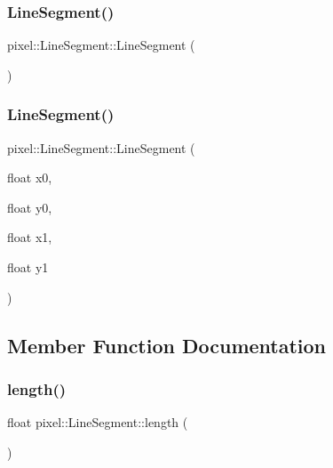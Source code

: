 \subsubsection{\texorpdfstring{Line\+Segment()}{LineSegment()}\hspace{0.1cm}{\footnotesize\ttfamily [1/2]}}
{\footnotesize\ttfamily pixel\+::\+Line\+Segment\+::\+Line\+Segment (\begin{DoxyParamCaption}{ }\end{DoxyParamCaption})\hspace{0.3cm}{\ttfamily [default]}}

\mbox{\label{classpixel_1_1_line_segment_a908ff0ace1fa46fa4ddc23d0f4413b18}} 
\subsubsection{\texorpdfstring{Line\+Segment()}{LineSegment()}\hspace{0.1cm}{\footnotesize\ttfamily [2/2]}}
{\footnotesize\ttfamily pixel\+::\+Line\+Segment\+::\+Line\+Segment (\begin{DoxyParamCaption}\item[{float}]{x0,  }\item[{float}]{y0,  }\item[{float}]{x1,  }\item[{float}]{y1 }\end{DoxyParamCaption})\hspace{0.3cm}{\ttfamily [inline]}}



\subsection{Member Function Documentation}
\mbox{\label{classpixel_1_1_line_segment_ad3bac4aae966e09f98586c47f70dee44}} 
\subsubsection{\texorpdfstring{length()}{length()}}
{\footnotesize\ttfamily float pixel\+::\+Line\+Segment\+::length (\begin{DoxyParamCaption}{ }\end{DoxyParamCaption})\hspace{0.3cm}{\ttfamily [inline]}}



